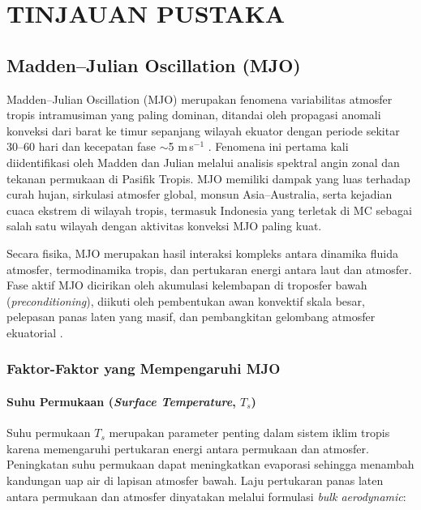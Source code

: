 \documentclass[12pt,a4paper]{report}
\begin{document}
\chapter{TINJAUAN PUSTAKA}

\section{Madden--Julian Oscillation (MJO)}
 
Madden--Julian Oscillation (MJO) merupakan fenomena variabilitas atmosfer
tropis intramusiman yang paling dominan, ditandai oleh propagasi anomali
konveksi dari barat ke timur sepanjang wilayah ekuator dengan periode
sekitar 30--60 hari dan kecepatan fase $\sim$5 m\,s$^{-1}$
\cite{madden1971, zhang2005}. Fenomena ini pertama kali diidentifikasi oleh
Madden dan Julian \cite{madden1971} melalui analisis spektral angin zonal
dan tekanan permukaan di Pasifik Tropis. MJO memiliki dampak yang luas
terhadap curah hujan, sirkulasi atmosfer global, monsun Asia--Australia,
serta kejadian cuaca ekstrem di wilayah tropis, termasuk Indonesia yang
terletak di MC sebagai salah satu wilayah dengan
aktivitas konveksi MJO paling kuat.
 
Secara fisika, MJO merupakan hasil interaksi kompleks antara dinamika fluida
atmosfer, termodinamika tropis, dan pertukaran energi antara laut dan
atmosfer. Fase aktif MJO dicirikan oleh akumulasi kelembapan di troposfer
bawah (\textit{preconditioning}), diikuti oleh pembentukan awan konvektif
skala besar, pelepasan panas laten yang masif, dan pembangkitan gelombang
atmosfer ekuatorial \cite{zhang2005, kiladis2009}.
 
\subsection{Faktor-Faktor yang Mempengaruhi MJO}
 
\subsubsection{Suhu Permukaan (\textit{Surface Temperature}, $T_s$)}
 
Suhu permukaan $T_s$ merupakan parameter penting dalam sistem iklim tropis
karena memengaruhi pertukaran energi antara permukaan dan atmosfer.
Peningkatan suhu permukaan dapat meningkatkan evaporasi sehingga menambah
kandungan uap air di lapisan atmosfer bawah. Laju pertukaran panas laten
antara permukaan dan atmosfer dinyatakan melalui formulasi
\textit{bulk aerodynamic}:
 
\end{document}

